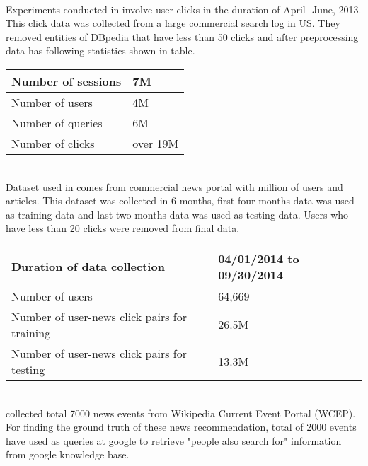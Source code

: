 \\
Experiments conducted in \cite{N19} involve user clicks in the duration of April- June, 2013. This click data was collected from a large commercial search log in US. They removed entities of DBpedia that have less than 50 clicks and after preprocessing data has following statistics shown in table.  
\\
\begin{table}[!htbp] 
\centering
\footnotesize
\def\arraystretch{1.4}%
\centering
\begin{tabular}{|p{8cm}|p{2cm}|}
\hline
Number of sessions& 7M
\\
\hline
Number of users & 4M
\\
\hline 
Number of queries & 6M
\\
\hline 
Number of clicks & over 19M
\\
\hline
\end{tabular}

\end{table}
\\
Dataset used in \cite{N62} comes from commercial news portal with million of users and articles. This dataset was collected in 6 months, first four months data was used as training data and last two months data was used as testing data. Users who have less than 20 clicks were removed from final data.
\\
\begin{table}[!htbp] 
\centering
\footnotesize
\def\arraystretch{1.4}%
\centering
\begin{tabular}{|p{8cm}|p{2cm}|}
\hline
Duration of data collection & 04/01/2014 to 09/30/2014
\\
\hline
Number of users & 64,669
\\
\hline 
Number of user-news click pairs for training & 26.5M
\\
\hline 
Number of user-news click pairs for testing & 13.3M
\\
\hline
\end{tabular}

\end{table}
\\
\cite{N20} collected total 7000 news events from Wikipedia Current Event Portal (WCEP).  For finding the ground truth of these news recommendation, total of 2000 events have used as queries at google to retrieve "people also search for" information from google knowledge base. 
